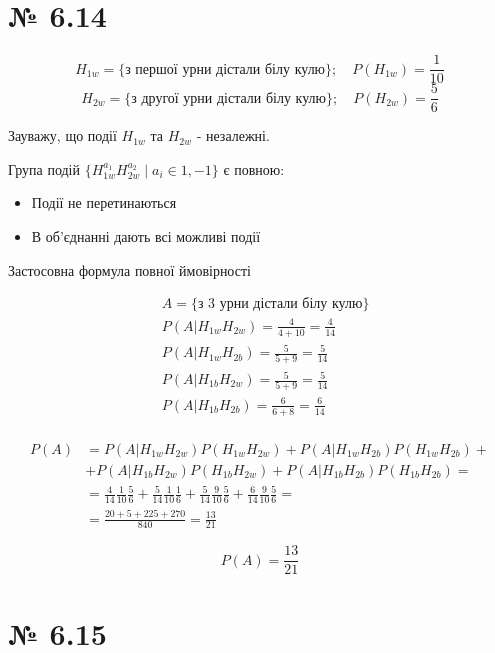 \documentclass[11pt, a4paper]{article} %
\begin{document}
\section*{№ 6.14}
$$
H_{1w} = \{\text{з першої урни дістали білу кулю}\}; \quad P(H_{1w}) = \frac{1}{10}$$
$$
H_{2w} = \{\text{з другої урни дістали білу кулю}\}; \quad P(H_{2w}) = \frac{5}{6}
$$

Зауважу, що події $H_{1w}$ та $H_{2w}$ - незалежні.

Група подій $\{ H_{1w}^{a_1} H_{2w}^{a_2} \; | \; a_i \in {1, -1} \}$ є повною:
\begin{itemize}
    \item Події не перетинаються
    \item В об'єднанні дають всі можливі події
\end{itemize}

Застосовна формула повної ймовірності

\begin{align*}
    & A = \{\text{з 3 урни дістали білу кулю}\} \\
    & P(A|H_{1w}H_{2w}) = \frac{4}{4+10} = \frac{4}{14} \\
    & P(A|H_{1w}H_{2b}) = \frac{5}{5+9} = \frac{5}{14} \\
    & P(A|H_{1b}H_{2w}) = \frac{5}{5+9} = \frac{5}{14} \\
    & P(A|H_{1b}H_{2b}) = \frac{6}{6+8} = \frac{6}{14} \\
\end{align*}

\begin{align*}
    P(A) &=  
    P(A|H_{1w}H_{2w}) P(H_{1w}H_{2w}) +
    P(A|H_{1w}H_{2b}) P(H_{1w}H_{2b}) + \\
    &+ P(A|H_{1b}H_{2w}) P(H_{1b}H_{2w}) +
    P(A|H_{1b}H_{2b}) P(H_{1b}H_{2b}) = \\
    &= \frac{4}{14} \frac{1}{10} \frac{5}{6} + \frac{5}{14} \frac{1}{10} \frac{1}{6} 
    + \frac{5}{14} \frac{9}{10} \frac{5}{6} + \frac{6}{14} \frac{9}{10} \frac{5}{6} = \\
    &= \frac{20 + 5 + 225 + 270}{840} = \frac{13}{21}
\end{align*}

\begin{mdframed}[style=ans]
    $$P(A) = \frac{13}{21}$$
\end{mdframed}

\pagebreak

\section*{№ 6.15}
\end{document}
